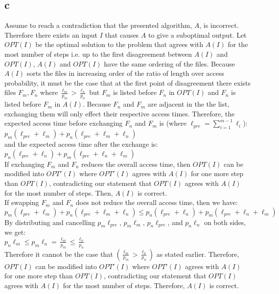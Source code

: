 \documentclass[letterpaper,notitlepage,twoside]{article}
\newcommand\tab[1][1cm]{\hspace*{#1}} %
\begin{document}
\subsection*{c}
Assume to reach a contradiction that the presented algorithm, $A$, is incorrect. Therefore there exists an input $I$ that causes $A$ to give a suboptimal output. Let $OPT(I)$ be the optimal solution to the problem that agrees with $A(I)$ for the most number of steps i.e. up to the first disagreement between $A(I)$ and $OPT(I)$, $A(I)$ and $OPT(I)$ have the same ordering of the files. Because $A(I)$ sorts the files in increasing order of the ratio of length over access probability, it must be the case that at the first point of disagreement there exists files $F_m, F_n$ where $\frac{\ell_m}{p_m} > \frac{\ell_n}{p_n}$ but $F_m$ is listed before $F_n$ in $OPT(I)$ and $F_n$ is listed before $F_m$ in $A(I)$. Because $F_n$ and $F_m$ are adjacent in the the list, exchanging them will only effect their respective access times. Therefore, the expected access time before exchanging $F_n$ and $F_m$ is (where $\ell_{pre} = \sum_{i=1}^{m-1} \ell_i$):\\
\tab$p_m(\ell_{pre}+\ell_m)+p_n(\ell_{pre}+\ell_m+\ell_n)$\\
and the expected access time after the exchange is:\\
\tab$p_n(\ell_{pre}+\ell_n)+p_m(\ell_{pre}+\ell_n+\ell_m)$\\
If exchanging $F_m$ and $F_n$ reduces the overall access time, then $OPT(I)$ can be modified into $OPT'(I)$ where $OPT'(I)$ agrees with $A(I)$ for one more step than $OPT(I)$, contradicting our statement that $OPT(I)$ agrees with $A(I)$ for the most number of steps. Then, $A(I)$ is correct. \\
If swapping $F_m$ and $F_n$ does not reduce the overall access time, then we have: \\
\tab$p_m(\ell_{pre}+\ell_m)+p_n(\ell_{pre}+\ell_m+\ell_n) \leq p_n(\ell_{pre}+\ell_n)+p_m(\ell_{pre}+\ell_n+\ell_m)$ \\
By distributing and cancelling $p_m\ell_{pre}$, $p_m\ell_m$, $p_n\ell_{pre}$, and $p_n\ell_n$ on both sides, we get:\\
\tab$p_n\ell_m \leq p_m\ell_n = \frac{\ell_m}{p_m} \leq \frac{\ell_n}{p_n}$\\
Therefore it cannot be the case that $(\frac{\ell_m}{p_m} > \frac{\ell_n}{p_n})$ as stated earlier. Therefore, $OPT(I)$ can be modified into $OPT'(I)$ where $OPT'(I)$ agrees with $A(I)$ for one more step than $OPT(I)$, contradicting our statement that $OPT(I)$ agrees with $A(I)$ for the most number of steps. Therefore, $A(I)$ is correct.
\end{document}
